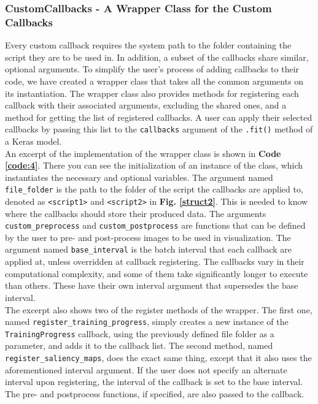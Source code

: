 \subsubsection{CustomCallbacks - A Wrapper Class for the Custom Callbacks}

Every custom callback requires the system path to the folder containing the script they are to be used in. In addition, a subset of the callbacks share similar, optional arguments. To simplify the user's process of adding callbacks to their code, we have created a wrapper class that takes all the common arguments on its instantiation. The wrapper class also provides methods for registering each callback with their associated arguments, excluding the shared ones, and a method for getting the list of registered callbacks. A user can apply their selected callbacks by passing this list to the \texttt{callbacks} argument of the \texttt{.fit()} method of a Keras model.\\

\noindent An excerpt of the implementation of the wrapper class is shown in \textbf{Code \ref{code:4}}. There you can see the initialization of an instance of the class, which instantiates the necessary and optional variables. The argument named \texttt{file\_folder} is the path to the folder of the script the callbacks are applied to, denoted as \texttt{<script1>} and \texttt{<script2>} in \textbf{Fig. \ref{struct2}}. This is needed to know where the callbacks should store their produced data. The arguments \texttt{custom\_preprocess} and \texttt{custom\_postprocess} are functions that can be defined by the user to pre- and post-process images to be used in visualization. The argument named \texttt{base\_interval} is the batch interval that each callback are applied at, unless overridden at callback registering. The callbacks vary in their computational complexity, and some of them take significantly longer to execute than others. These have their own interval argument that supersedes the base interval. \\

\noindent The excerpt also shows two of the register methods of the wrapper. The first one, named \texttt{register\_training\_progress}, simply creates a new instance of the \texttt{TrainingProgress} callback, using the previously defined file folder as a parameter, and adds it to the callback list. The second method, named \texttt{register\_saliency\_maps}, does the exact same thing, except that it also uses the aforementioned interval argument. If the user does not specify an alternate interval upon registering, the interval of the callback is set to the base interval. The pre- and postprocess functions, if specified, are also passed to the callback.

